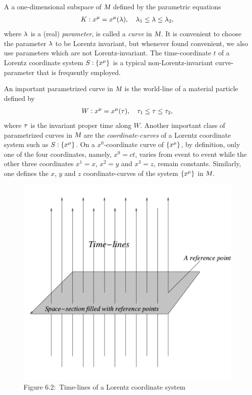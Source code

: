 \dfn A a one-dimensional subspace of $\textsl{M}$ 
defined 
by the parametric equations 
\begin{align}
K: x^{{\mu}}=x^{{\mu}}({\lambda}), \quad {\lambda}_1\leq{\lambda}\leq{\lambda}_2,
\end{align}
where ${\lambda}$ is a (real) \textsl{parameter}, is called 
a 
\textsl{curve} in $\textsl{M}$. It is convenient to 
choose 
the parameter ${\lambda}$ to be Lorentz invariant, but 
whenever 
found convenient, we also use parameters which are not 
Lorentz-invariant. The time-coordinate $t$ of a 
Lorentz 
coordinate system $S:\{x^{{\mu}}\}$ is a typical 
non-Lorentz-invariant curve-parameter that is 
frequently 
employed.

An important parametrized curve in $\textsl{M}$ is the 
world-line of a material particle defined by
\begin{align}
 W:x^{{\mu}}=x^{{\mu}}({\tau}), \quad {\tau}_1\leq{\tau}\leq{\tau}_2,
\end{align}
where ${\tau}$ is the invariant proper time along $W$. 
Another important class of parametrized curves in 
$\textsl{M}$ are the \textsl{coordinate-curves} of a 
Lorentz coordinate system such as $S:\{x^{{\mu}}\}$. On a 
$x^0$-coordinate curve of $\{x^{{\mu}}\}$, by definition, 
only 
one of the four coordinates, namely, $x^0=ct$, varies 
from 
event to event while the other three coordinates 
$x^1=x$, 
$x^2=y$ and $x^3=z$, remain constants. Similarly, one 
defines  the $x$, $y$ and $z$ coordinate-curves of the 
system $\{x^{{\mu}}\}$ in $\textsl{M}$.

\begin{figure}[H]
\centering
\includegraphics[scale=.3]{src/images/lbk-graphics/space-section-bw}
\caption*{Figure 6.2:~Time-lines of a Lorentz coordinate system}
\end{figure}

